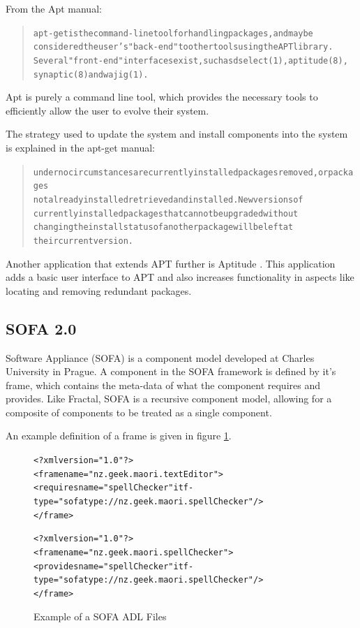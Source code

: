 From the Apt manual:
\begin{quotation}
\begin{alltt}
apt-get is the command-line tool for handling packages, and may be
       considered the user's "back-end" to other tools using the APT library.
       Several "front-end" interfaces exist, such as dselect(1), aptitude(8),
       synaptic(8) and wajig(1).
 \end{alltt}
\end{quotation}

Apt is purely a command line tool, which provides the necessary tools to efficiently allow the user to evolve their system.

The strategy used to update the system and install components into the system is explained in the apt-get manual:

\begin{quotation}
\begin{alltt}
       under no circumstances are currently installed packages removed, or packages
       not already installed retrieved and installed. New versions of
       currently installed packages that cannot be upgraded without
       changing the install status of another package will be left at
       their current version.
 \end{alltt}
\end{quotation}

Another application that extends APT further is Aptitude \cite{Burrows2005}.
This application adds a basic user interface to APT and also increases functionality in aspects like locating and removing redundant packages. 

\subsection{SOFA 2.0}
Software Appliance (SOFA) is a component model developed at Charles University in Prague.
A component in the SOFA framework is defined by it's frame, which contains the meta-data of what the component requires and provides.
Like Fractal, SOFA is a recursive component model, allowing for a composite of components to be treated as a single component.

An example definition of a frame is given in figure \ref{SOFAmetadata}.

\begin{figure}[htp] 
\begin{center}
\begin{alltt}
<?xml version="1.0"?>
<frame name="nz.geek.maori.textEditor">
  <requires name="spellChecker" itf-type="sofatype://nz.geek.maori.spellChecker"/>
</frame>

<?xml version="1.0"?>
<frame name="nz.geek.maori.spellChecker">
  <provides name="spellChecker" itf-type="sofatype://nz.geek.maori.spellChecker"/>
</frame>
\end{alltt}
  \caption[SOFA ADL files]{Example of a SOFA ADL Files}
  \label{SOFAmetadata}
\end{center}
\end{figure}

